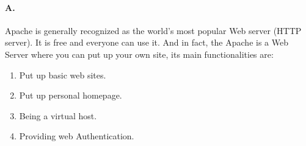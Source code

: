 \paragraph{A.}
Apache is generally recognized as the world's most popular Web server (HTTP server). It is free and everyone can use it. And in fact, the Apache is a Web Server where you can put up your own site, its main functionalities are:
\begin{enumerate}
	\item Put up basic web sites.
	\item Put up personal homepage.
	\item Being a virtual host.
	\item Providing web Authentication.
\end{enumerate} 